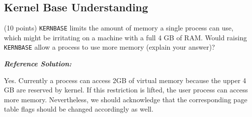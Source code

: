 \documentclass[]{article}
\begin{document}
\hypertarget{kernel-base-understanding}{%
\subsection{Kernel Base Understanding}\label{kernel-base-understanding}}

(10 points) \texttt{KERNBASE} limits the amount of memory a single
process can use, which might be irritating on a machine with a full 4 GB
of RAM. Would raising \texttt{KERNBASE} allow a process to use more
memory (explain your answer)?

\textbf{\emph{Reference Solution:}}

Yes. Currently a process can access 2GB of virtual memory because the
upper 4 GB are reserved by kernel. If this restriction is lifted, the
user process can access more memory. Nevertheless, we should acknowledge
that the corresponding page table flags should be changed accordingly as
well.
\end{document}
